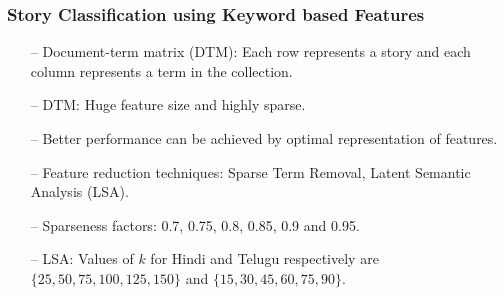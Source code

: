 \documentclass{beamer}
\begin{document}
\begin{frame} \label{Story Classification using Keyword based Features}
\frametitle{Story Classification using Keyword based Features}
\begin{itemize}
\item[--] Document-term matrix (DTM): Each row represents a story and each column represents
a term in the collection.
\item[--] DTM: Huge feature size and highly sparse. 
\item[--] Better performance can be achieved by optimal representation of features. 
\item[--] Feature reduction techniques: Sparse Term Removal, Latent Semantic Analysis (LSA).
\item[--] Sparseness factors: 0.7, 0.75, 0.8, 0.85, 0.9 and 0.95. \hyperlink{Sparse Term Removal}{\beamergotobutton{}}  
\item[--] LSA: Values of $k$ for Hindi and Telugu respectively are  $\lbrace 25, 50, 75, 100, 125, 150 \rbrace$ and $\lbrace 15, 30, 45, 60, 75, 90 \rbrace$. \hyperlink{LSA}{\beamergotobutton{}}

\end{itemize}
\end{frame}
\end{document}
